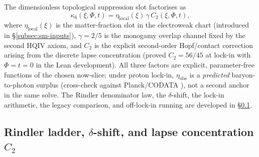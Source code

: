 \documentclass[11pt]{amsart}
\begin{document}
The dimensionless topological suppression slot factorises as
\[
\kappa_6(\xi,\Phi,t)=\eta_{\mathrm{local}}(\xi)\,\gamma\,C_2(\xi,\Phi,t),
\]
where $\eta_{\mathrm{local}}(\xi)$ is the matter-fraction slot in the electroweak chart (introduced in §\ref{subsec:sm-inputs}), $\gamma=2/5$ is the monogamy overlap channel fixed by the second HQIV axiom, and $C_2$ is the explicit second-order Hopf/contact correction arising from the discrete lapse concentration (proved $C_2=56/45$ at lock-in with $\Phi=t=0$ in the Lean development). All three factors are explicit, parameter-free functions of the chosen now-slice; under proton lock-in, $\eta_{\mathrm{obs}}$ is a \emph{predicted} baryon-to-photon surplus (cross-check against Planck/CODATA \cite{planck2018cosmo,codata2018,coc2015}), not a second anchor in the same solve. The Rindler denominator law, the $\delta$-shift, the lock-in arithmetic, the legacy comparison, and off-lock-in running are developed in \S\ref{sec:c2-rindler}.

\subsection{Rindler ladder, \texorpdfstring{$\delta$-shift}{delta-shift}, and lapse concentration \texorpdfstring{$C_2$}{C2}}
\label{sec:c2-rindler}
\end{document}
